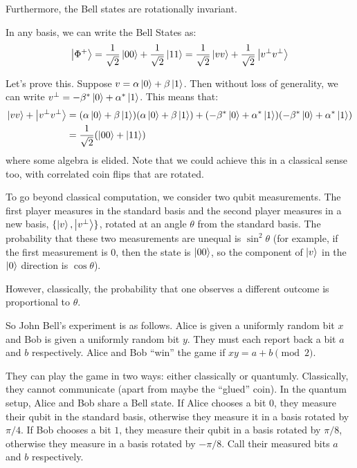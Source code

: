 Furthermore, the Bell states are rotationally invariant. 
\begin{theorem}
    In any basis, we can write the Bell States as:
    \[ \ket{\Phi^+} = \frac{1}{\sqrt{2}} \ket{00} + \frac{1}{\sqrt{2}} \ket{11} = \frac{1}{\sqrt{2}} \ket{vv} + \frac{1}{\sqrt{2}} \ket{v^{\perp} v^{\perp}} \]
\end{theorem}

Let's prove this. Suppose $v = \alpha \ket{0} + \beta \ket{1}$. Then without loss of generality, we can write $v^{\perp} = -\beta^* \ket{0} + \alpha^* \ket{1}$.
This means that:
\begin{align*}
    \ket{vv} + \ket{v^{\perp} v^{\perp}} &= \qty(\alpha \ket{0} + \beta \ket{1})\qty(\alpha \ket{0} + \beta \ket{1}) + \qty(-\beta^* \ket{0} + \alpha^* \ket{1}) \qty(-\beta^* \ket{0} + \alpha^* \ket{1}) \\
    &=  \frac{1}{\sqrt{2}} \qty(\ket{00} + \ket{11})
\end{align*}
where some algebra is elided. Note that we could achieve this
in a classical sense too, with correlated coin flips that are rotated.

To go beyond classical computation, we consider two qubit measurements.
The first player measures in the standard basis and the second player measures in a new basis, $\{ \ket{v}, \ket{v^{\perp}} \}$, rotated at an angle $\theta$ from the standard basis.
The probability that these two measurements are unequal is $\sin^2 \theta$ (for example, if the first measurement is $0$, then the state is $\ket{00}$, so the component of $\ket{v}$ in the $\ket{0}$ direction is $\cos \theta$).

However, classically, the probability that one observes a different outcome is proportional to $\theta$.

So John Bell's experiment is as follows. Alice is given a uniformly random bit $x$ and Bob is given a uniformly random bit $y$. They must each report back
a bit $a$ and $b$ respectively.
Alice and Bob ``win'' the game if $xy = a + b \pmod{2}$.

They can play the game in two ways: either classically or quantumly. Classically, they cannot communicate (apart from maybe the ``glued'' coin).
In the quantum setup, 
Alice and Bob share a Bell state.
If Alice chooses a bit $0$, they measure their qubit in the standard basis, otherwise they measure it in a basis rotated by $\pi/4$. If Bob
chooses a bit $1$, they measure their qubit in a basis rotated by $\pi/8$, otherwise they measure in a basis rotated by $-\pi/8$. Call their measured
bits $a$ and $b$ respectively.


